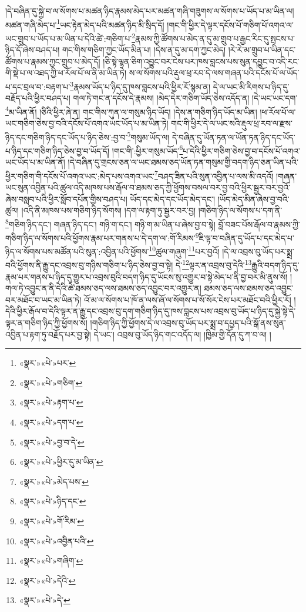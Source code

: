 །དེ་བཞིན་དུ་སྐྱེ་བ་ལ་སོགས་པ་མཚན་ཉིད་རྣམས་མེད་པར་མཚན་གཞི་གཟུགས་ལ་སོགས་པ་ཡོད་པ་མ་ཡིན་ལ། མཚན་གཞི་མེད་པ་\footnote{«སྣར་»«པེ་»པར་}ཡང་རྟེན་མེད་པའི་མཚན་ཉིད་མི་སྲིད་དོ། །གང་གི་ཕྱིར་དེ་ལྟར་དངོས་པོ་གཅིག་པོ་འགའ་ལ་ཡང་གྲུབ་པ་ཡོད་པ་མ་ཡིན་པ་དེའི་ཚེ་:གཅིག་པ་\footnote{«སྣར་»«པེ་»གཅིག་}རྣམས་ཀྱི་ཚོགས་པ་མེད་ན་དུ་མ་གྲུབ་པ་རྒྱང་རིང་དུ་སྤངས་པ་ཉིད་དོ་ཞེས་བཤད་པ། གང་གིས་གཅིག་ཀྱང་ཡོད་མིན་པ། །དེས་ན་དུ་མ་དག་ཀྱང་མེད། །རེ་རེ་མ་གྲུབ་པ་ཡིན་དང་ཚོགས་པ་རྣམས་ཀྱང་གྲུབ་པ་མེད་དོ། །ཅི་སྟེ་ལྷན་ཅིག་འབྱུང་བར་ངེས་པར་ཁས་བླངས་པས་སུན་དབྱུང་བ་འདི་རང་གི་སྡེ་པ་ལ་འཐད་ཀྱི་ཕ་རོལ་པོ་ལ་ནི་མ་ཡིན་ཏེ། ས་ལ་སོགས་པའི་རྡུལ་ཕྲ་རབ་དེ་ལས་གཞན་པའི་དངོས་པོ་ལ་ཡོད་པ་དང་བྲལ་བ་:བརྟག་པ་\footnote{«སྣར་»«པེ་»རྟག་པ་}རྣམས་ཡོད་པ་ཉིད་དུ་ཁས་བླངས་པའི་ཕྱིར་རོ་སྙམ་ན། དེ་ལ་ཡང་མི་རིགས་པ་ཉིད་དུ་བརྗོད་པའི་ཕྱིར་བཤད་པ། གལ་ཏེ་གང་ན་དངོས་དེ་རྣམས། །མེད་དེར་གཅིག་ཡོད་ཅེས་འདོད་ན། །དེ་ཡང་ཡང་དག་\footnote{«སྣར་»«པེ་»དག་པ་}མ་ཡིན་ནོ། །ཅིའི་ཕྱིར་ཞེ་ན། གང་གིས་ཀུན་ལ་གསུམ་ཉིད་ཡོད། །དེས་ན་གཅིག་ཉིད་ཡོད་མ་ཡིན། །ཕ་རོལ་པོ་ལ་ཡང་གཅིག་ཅེས་བྱ་བའི་དངོས་པོ་འགའ་ཡང་ཡོད་པ་མ་ཡིན་ཏེ། གང་གི་ཕྱིར་དེ་ལ་ཡང་སའི་རྡུལ་ཕྲ་རབ་ལ་རྫས་ཉིད་དང་གཅིག་ཉིད་དང་ཡོད་པ་ཉིད་ཅེས་:བྱ་བ་\footnote{«སྣར་»«པེ་»བྱ་བ་དེ་}གསུམ་ཡོད་ལ། དེ་བཞིན་དུ་ཡོན་ཏན་ལ་ཡོན་ཏན་ཉིད་དང་ཡོད་པ་ཉིད་དང་གཅིག་ཉིད་ཅེས་བྱ་བ་ཡོད་དོ། །གང་གི་:ཕྱིར་གསུམ་ཡོད་\footnote{«སྣར་»«པེ་»ཕྱིར་དུ་མ་ཡིན་}པ་དེའི་ཕྱིར་གཅིག་ཅེས་བྱ་བ་དངོས་པོ་འགའ་ཡང་ཡོད་པ་མ་ཡིན་ནོ། །དེ་བཞིན་དུ་གྲངས་ཅན་ལ་ཡང་ཐམས་ཅད་ཡོན་ཏན་གསུམ་གྱི་བདག་ཉིད་ཅན་ཡིན་པའི་ཕྱིར་གཅིག་གི་དངོས་པོ་འགའ་ཡང་:མེད་པས་འགའ་ཡང་\footnote{«སྣར་»«པེ་»མེད་པས་}བཤད་ཟིན་པའི་སུན་འབྱིན་པ་ལས་མི་འདའོ། །གཞན་ཡང་སུན་འབྱིན་པའི་ཚུལ་འདི་མཁས་པས་རྒོལ་བ་ཐམས་ཅད་ཀྱི་ཕྱོགས་བསལ་བར་བྱ་བའི་ཕྱིར་སྦྱར་བར་བྱའོ་ཞེས་བསླབ་པའི་ཕྱིར་སློབ་དཔོན་གྱིས་བཤད་པ། ཡོད་དང་མེད་དང་ཡོད་མེད་དང་། །ཡོད་མེད་མིན་ཞེས་བྱ་བའི་ཚུལ། །འདི་ནི་མཁས་པས་གཅིག་ཉིད་སོགས། །དག་ལ་རྟག་ཏུ་སྦྱར་བར་བྱ། །གཅིག་ཉིད་ལ་སོགས་པ་དག་ནི་\footnote{«སྣར་»«པེ་»ཉིད་དང་}གཅིག་ཉིད་དང་། གཞན་ཉིད་དང་། གཉི་ག་དང་། གཉི་ག་མ་ཡིན་པ་ཞེས་བྱ་བ་སྟེ། བློ་བཟང་པོས་རྒོལ་བ་རྣམས་ཀྱི་གཅིག་ཉིད་ལ་སོགས་པའི་ཕྱོགས་རྣམ་པར་གནས་པ་དེ་དག་ལ་:གོ་རིམས་\footnote{«སྣར་»«པེ་»གོ་རིམ་}ཇི་ལྟ་བ་བཞིན་དུ་ཡོད་པ་དང་མེད་པ་ཉིད་ལ་སོགས་པས་མཚོན་པའི་སུན་:འབྱིན་པའི་ཕྱོགས་\footnote{«སྣར་»«པེ་»འབྱིན་པའི་}ཚུལ་གཞུག་\footnote{«སྣར་»«པེ་»གཞིག་}པར་བྱའོ། །དེ་ལ་འབྲས་བུ་ཡོད་པར་སྨྲ་བའི་ཕྱོགས་ནི་རྒྱུ་དང་འབྲས་བུ་གཉིས་གཅིག་པ་ཉིད་ཅེས་བྱ་བ་སྟེ། དེ་\footnote{«སྣར་»«པེ་»དེའི་}ལྟར་ན་འབྲས་བུ་དེའི་\footnote{«སྣར་»«པེ་»དེ་}རྒྱུའི་བདག་ཉིད་དུ་རྣམ་པར་གནས་པ་ཉིད་དུ་གྱུར་པ་འབྲས་བུའི་བདག་ཉིད་དུ་ཡོངས་སུ་འགྱུར་བ་སྟེ་མེད་པ་ནི་བྱ་བར་མི་ནུས་སོ། །གལ་ཏེ་འབྱུང་ན་ནི་དེའི་ཚེ་ཐམས་ཅད་ལས་ཐམས་ཅད་འབྱུང་བར་འགྱུར་ན། ཐམས་ཅད་ལས་ཐམས་ཅད་འབྱུང་བར་མཐོང་བ་ཡང་མ་ཡིན་ཏེ། འོ་མ་ལ་སོགས་པ་ཁོ་ན་ལས་ཞོ་ལ་སོགས་པ་སོ་སོར་ངེས་པར་མཐོང་བའི་ཕྱིར་རོ། །དེའི་ཕྱིར་རྒོལ་བ་དེའི་ལྟར་ན་རྒྱུ་དང་འབྲས་བུ་དག་གཅིག་ཉིད་དུ་ཁས་བླངས་པས་འབྲས་བུ་ཡོད་པ་ཉིད་དུ་སྐྱེ་སྟེ་དེ་ལྟར་ན་གཅིག་ཉིད་ཀྱི་ཕྱོགས་སོ། །གཅིག་ཉིད་ཀྱི་ཕྱོགས་དེ་ལ་འབྲས་བུ་ཡོད་པར་སྨྲ་བ་དཔྱད་པའི་སྒོ་ནས་སུན་འབྱིན་པ་རྟག་ཏུ་བརྗོད་པར་བྱ་སྟེ། དེ་ཡང་། འབྲས་བུ་ཡོད་ཉིད་གང་འདོད་ལ། །ཁྱིམ་གྱི་དོན་དུ་ཀ་བ་ལ། །
